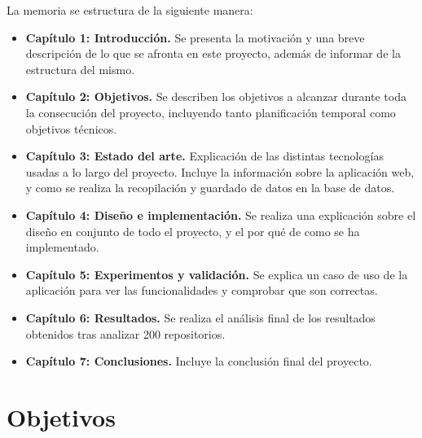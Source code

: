 \documentclass[a4paper, 12pt]{book}
\begin{document}
La memoria se estructura de la siguiente manera:


\begin{itemize}
  \item \textbf{Capítulo 1: Introducción.} Se presenta la motivación y una breve descripción de lo que se afronta en este proyecto, además de informar de la estructura del mismo.

  \item \textbf{Capítulo 2: Objetivos.} Se describen los objetivos a alcanzar durante toda la consecución del proyecto, incluyendo tanto planificación temporal como objetivos técnicos.

  \item \textbf{Capítulo 3: Estado del arte.} Explicación de las distintas tecnologías usadas a lo largo del proyecto. Incluye la información sobre la aplicación web, y como se realiza la recopilación y guardado de datos en la base de datos.

  \item \textbf{Capítulo 4: Diseño e implementación.} Se realiza una explicación sobre el diseño en conjunto de todo el proyecto, y el por qué de como se ha implementado.

  \item \textbf{Capítulo 5: Experimentos y validación.} Se explica un caso de uso de la aplicación para ver las funcionalidades y comprobar que son correctas.

  \item \textbf{Capítulo 6: Resultados.} Se realiza el análisis final de los resultados obtenidos tras analizar 200 repositorios.

  \item \textbf{Capítulo 7: Conclusiones.} Incluye la conclusión final del proyecto.

\end{itemize}


\cleardoublepage %
\chapter{Objetivos} %
\label{chap:objetivos} %
\end{document}
